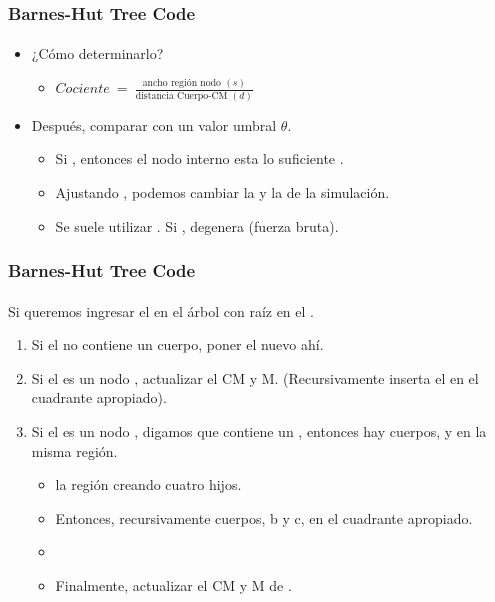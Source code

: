\frame
{
\frametitle{Barnes-Hut Tree Code}
\framesubtitle{}

\begin{itemize}
	\item ¿Cómo determinarlo?
	\begin{itemize}
		\item $ Cociente\ =\ \frac{\text{ancho región nodo }(s)}{\text{distancia Cuerpo-CM }(d)}$
	\end{itemize}
	\item Después, comparar con un valor umbral $\theta$.
	\begin{itemize}
		\item Si , entonces el nodo interno esta lo suficiente .
		\item Ajustando \blue{$\theta$}, podemos cambiar la  y la  de la simulación.
		\item Se suele utilizar . Si , degenera (fuerza bruta).
	\end{itemize}
\end{itemize}
}

\frame
{
\frametitle{Barnes-Hut Tree Code}
\framesubtitle{}

Si queremos ingresar el  en el árbol con raíz en el .

\begin{enumerate}
	\item<1-> Si el  no contiene un cuerpo, poner el nuevo  ahí.
	\item<2-> Si el  es un nodo , actualizar el CM
		y M. (Recursivamente inserta el  en el cuadrante apropiado).
	\item<3-> Si el  es un nodo , digamos que contiene un , entonces hay  cuerpos,  y  en la misma región.
		\begin{itemize}
			\item<4->  la región creando cuatro hijos.
			\item<5-> Entonces, recursivamente  cuerpos, b y c, en el cuadrante apropiado.
			\item<6-> 
			\item<7-> Finalmente, actualizar el CM y M de .
		\end{itemize}
\end{enumerate}
}

